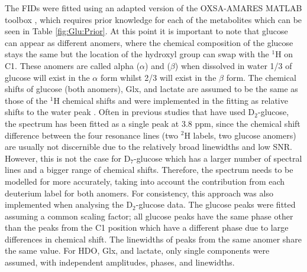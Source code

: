 The \ac{FID}s were fitted using an adapted version of the OXSA-\ac{AMARES} MATLAB toolbox \cite{Vanhamme1997ImprovedKnowledge, Purvis2017OXSA:MATLAB}, which requires prior knowledge for each of the metabolites which can be seen in Table \ref{fig:Glu:Prior}. At this point it is important to note that glucose can appear as different anomers, where the chemical composition of the glucose stays the same but the location of the hydroxyl group can swap with the $^1$H on C1. These anomers are called alpha ($\alpha$) and ($\beta$) when dissolved in water 1/3 of glucose will exist in the $\alpha$ form whilst 2/3 will exist in the $\beta$ form. The chemical shifts of glucose (both anomers), Glx, and lactate are assumed to be the same as those of the $^1$H chemical shifts \cite{Govindaraju2000ProtonMetabolites} and were implemented in the fitting as relative shifts to the water peak \cite{Meerwaldt2023InImaging}. Often in previous studies that have used D$_2$-glucose, the spectrum has been fitted as a single peak at 3.8 ppm, since the chemical shift difference between the four resonance lines (two $^2$H labels, two glucose anomers) are usually not discernible due to the relatively broad linewidths and low SNR. However, this is not the case for D$_7$-glucose \cite{Govindaraju2000ProtonMetabolites} which has a larger number of spectral lines and a bigger range of chemical shifts. Therefore, the spectrum needs to be modelled for more accurately, taking into account the contribution from each deuterium label for both anomers. For consistency, this approach was also implemented when analysing the D$_2$-glucose data. The glucose peaks were fitted assuming a common scaling factor; all glucose peaks have the same phase other than the peaks from the C1 position which have a different phase due to large differences in chemical shift. The linewidths of peaks from the same anomer share the same value. For \ac{HDO}, Glx, and lactate, only single components were assumed, with independent amplitudes, phases, and linewidths.

